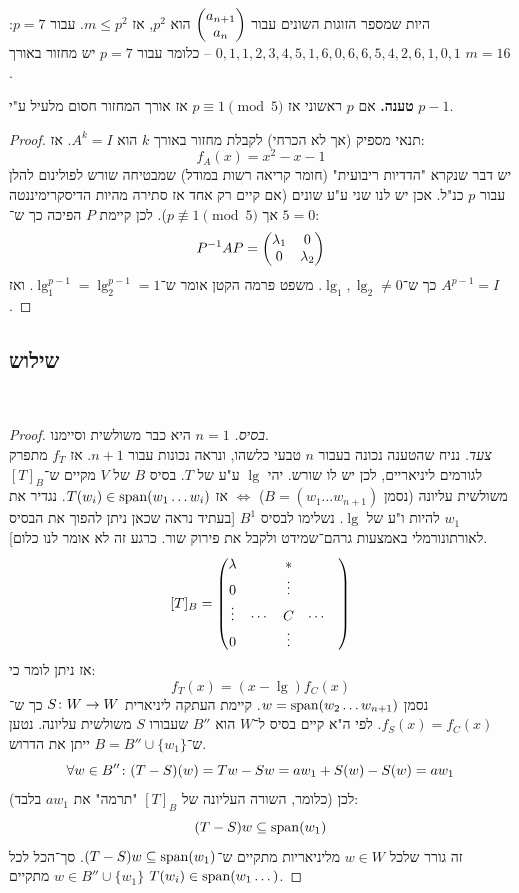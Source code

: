 \documentclass[name=רשימות אלגברה לינארית 2א]{../../../tex/classes/megasumPreamble}
\begin{document}
	היות שמספר הזוגות השונים עבור $\begin{pmatrix} a_{n + 1} \\ a_n \end{pmatrix}$ הוא $p^2$, אז $m \le p^2$. עבור $p = 7$: \hfill $0, 1, 1, 2, 3, 4, 5, 1, 6, 0, 6, 6, 5, 4, 2, 6, 1, 0, 1$ – כלומר עבור $p = 7$ יש מחזור באורך $m = 16$.
	
	\textbf{טענה. }אם $p$ ראשוני אז $p \equiv 1 \pmod 5$ אז אורך המחזור חסום מלעיל ע"י $p - 1$. 
	
	\begin{proof}
		תנאי מספיק (אך לא הכרחי) לקבלת מחזור באורך $k$ הוא $A^k = I$. אז: 
		\[ f_A(x) = x^2 - x - 1 \]
		יש דבר שנקרא "הדדיות ריבועית" (חומר קריאה רשות במודל) שמבטיחה שורש לפולינום להלן עבור $p$ כנ"ל. אכן יש לנו שני ע"ע שונים (אם קיים רק אחד אז סתירה מהיות הדיסקרימיננטה $5 = 0$ אך $p \not\equiv 1 \pmod 5$). לכן קיימת $P$ הפיכה כך ש־: 
		\[ P^{-1} AP = \begin{pmatrix} \lambda_1 & 0 \\ 0 & \lambda_2 \end{pmatrix} \]
		כך ש־$\lg_1, \lg_2 \neq 0$. משפט פרמה הקטן אומר ש־$\lg_1^{p - 1}  = \lg_2^{p - 1} = 1$. ואז $A^{p - 1} = I$. 
	\end{proof}
	
	\subsection{שילוש}\ 
	
	
	\begin{proof}
		\textit{בסיס. }$n = 1$ היא כבר משולשית וסיימנו. \\
		\textit{צעד. }נניח שהטענה נכונה בעבור $n$ טבעי כלשהו, ונראה נכונות עבור $n + 1$. אז $f_T$ מתפרק לגורמים ליניאריים, לכן יש לו שורש. יהי $\lg$ ע"ע של $T$. בסיס $B$ של $V$ מקיים ש־$[T]_B$ משולשית עליונה (נסמן $B = (w_1 \dots w_{n + 1})$) $\iff$ אז $T(w_i) \in \operatorname{span}(w_1 \dots w_i)$. נגדיר את $w_1$ להיות ו"ע של $\lg$. נשלימו לבסיס $B^1$ [בעתיד נראה שכאן ניתן להפוך את הבסיס לאורתונורמלי באמצעות גרהם־שמידט ולקבל את פירוק שור. כרגע זה לא אומר לנו כלום]. 
		\[ [T]_B = \begin{pmatrix} \lambda & & * && \\ 0 && \vdots \\ \vdots &\cdots & C & \cdots \\ 0 & &\vdots  \end{pmatrix} \]
		אז ניתן לומר כי: 
		\[ f_T(x) = (x - \lg) f_C(x) \]
		נסמן $w = \operatorname{span}(w_2 \dots w_{n + 1})$. קיימת העתקה ליניארית $S \colon W \to W$ כך ש־$f_S(x) = f_C(x)$. לפי ה"א קיים בסיס ל־$W$ הוא $B''$ שעבורו $S$ משולשית עליונה. נטען ש־$B = B'' \cup \{w_1\}$ ייתן את הדרוש. 
		\[ \forall w \in B'' \colon (T - S)(w) = Tw - Sw = aw_1 + S(w) - S(w) = aw_1 \]
		(כלומר, השורה העליונה של $[T]_B$ "תרמה" את $aw_1$ בלבד)
		לכן: 
		\[ (T - S)w \subseteq \operatorname{span}(w_1) \]
		זה גורר שלכל $w \in W$ מליניאריות מתקיים ש־$(T - S)w \subseteq \operatorname{span}(w_1)$. סך־הכל לכל $w \in B'' \cup \{w_1\}$ מתקיים $T(w_i) \in \operatorname{span}(w_1 \dots)$. 
	\end{proof}
	
\end{document}
